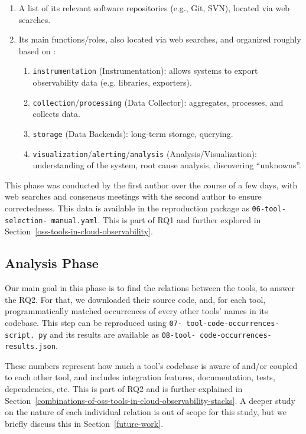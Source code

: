 \documentclass[sigconf]{acmart}
\begin{document}
\begin{enumerate}
\item
  A list of its relevant software repositories (e.g., Git, SVN), located
  via web searches.
\item
  Its main functions/roles, also located via web searches, and organized
  roughly based on \cite{kosinska2023observability}:

  \begin{enumerate}
  \item
    \texttt{instrumentation} (Instrumentation): allows systems to export
    observability data (e.g. libraries, exporters).
  \item
    \texttt{collection}/\texttt{processing} (Data Collector):
    aggregates, processes, and collects data.
  \item
    \texttt{storage} (Data Backends): long-term storage, querying.
  \item
    \texttt{visualization}/\texttt{alerting}/\texttt{analysis}
    (Analysis/Visualization): understanding of the system, root cause
    analysis, discovering ``unknowns''.
  \end{enumerate}
\end{enumerate}

This phase was conducted by the first author over the course of a few
days, with web searches and consensus meetings with the second author
to ensure correctedness. This data is available in the reproduction
package as \texttt{06-\allowbreak tool-\allowbreak selection-\allowbreak
manual.\allowbreak yaml}. This is part of RQ1 and further explored in
Section~\ref{oss-tools-in-cloud-observability}.

\subsection{Analysis Phase}\label{analysis-phase}

Our main goal in this phase is to find the relations between the tools, to
answer the RQ2. For that, we downloaded their source code, and, for each
tool, programmatically matched occurrences of every other tools' names
in its codebase. This step can be reproduced using \texttt{07-\allowbreak
tool-\allowbreak code-\allowbreak occurrences-\allowbreak script.\allowbreak
py} and its results are available as \texttt{08-\allowbreak tool-\allowbreak
code-\allowbreak occurrences-\allowbreak results.\allowbreak json}.

These numbers represent how much a tool's codebase is aware of and/or
coupled to each other tool, and includes integration features, documentation,
tests, dependencies, etc. This is part of RQ2 and is further explained in
Section~\ref{combinations-of-oss-tools-in-cloud-observability-stacks}. A deeper
study on the nature of each individual relation is out of scope for this study,
but we briefly discuss this in Section~\ref{future-work}.
\end{document}
